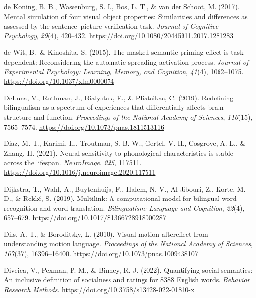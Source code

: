 \documentclass[
  12pt,
  man,floatsintext]{apa7}
\newlength{\cslhangindent}
\newlength{\cslentryspacingunit} %
\newenvironment{CSLReferences}[2] %
 {%
  \setlength{\parindent}{0pt}
  \ifodd #1
  \let\oldpar\par
  \def\par{\hangindent=\cslhangindent\oldpar}
  \fi
  \setlength{\parskip}{#2\cslentryspacingunit}
 }%
 {}
\begin{document}
\begin{CSLReferences}{1}{0}
\leavevmode{}%
de Koning, B. B., Wassenburg, S. I., Bos, L. T., \& van der Schoot, M. (2017). Mental simulation of four visual object properties: Similarities and differences as assessed by the sentence--picture verification task. \emph{Journal of Cognitive Psychology}, \emph{29}(4), 420--432. \url{https://doi.org/10.1080/20445911.2017.1281283}

\leavevmode{}%
de Wit, B., \& Kinoshita, S. (2015). The masked semantic priming effect is task dependent: {Reconsidering} the automatic spreading activation process. \emph{Journal of Experimental Psychology: Learning, Memory, and Cognition}, \emph{41}(4), 1062--1075. \url{https://doi.org/10.1037/xlm0000074}

\leavevmode{}%
DeLuca, V., Rothman, J., Bialystok, E., \& Pliatsikas, C. (2019). Redefining bilingualism as a spectrum of experiences that differentially affects brain structure and function. \emph{Proceedings of the National Academy of Sciences}, \emph{116}(15), 7565--7574. \url{https://doi.org/10.1073/pnas.1811513116}

\leavevmode{}%
Diaz, M. T., Karimi, H., Troutman, S. B. W., Gertel, V. H., Cosgrove, A. L., \& Zhang, H. (2021). Neural sensitivity to phonological characteristics is stable across the lifespan. \emph{NeuroImage}, \emph{225}, 117511. \url{https://doi.org/10.1016/j.neuroimage.2020.117511}

\leavevmode{}%
Dijkstra, T., Wahl, A., Buytenhuijs, F., Halem, N. V., Al-Jibouri, Z., Korte, M. D., \& Rekké, S. (2019). Multilink: {A} computational model for bilingual word recognition and word translation. \emph{Bilingualism: Language and Cognition}, \emph{22}(4), 657--679. \url{https://doi.org/10.1017/S1366728918000287}

\leavevmode{}%
Dils, A. T., \& Boroditsky, L. (2010). Visual motion aftereffect from understanding motion language. \emph{Proceedings of the National Academy of Sciences}, \emph{107}(37), 16396--16400. \url{https://doi.org/10.1073/pnas.1009438107}

\leavevmode{}%
Diveica, V., Pexman, P. M., \& Binney, R. J. (2022). Quantifying social semantics: {An} inclusive definition of socialness and ratings for 8388 {English} words. \emph{Behavior Research Methods}. \url{https://doi.org/10.3758/s13428-022-01810-x}


\end{CSLReferences}
\end{document}
